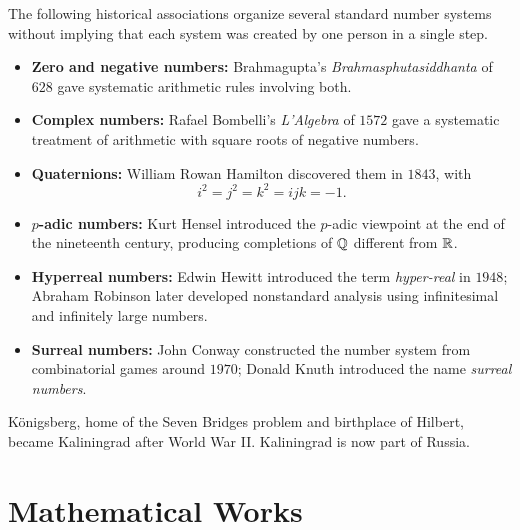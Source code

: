    \begin{fact}
        The following historical associations organize several standard number
        systems without implying that each system was created by one person in
        a single step.
        \begin{itemize}
            \item \textbf{Zero and negative numbers:} Brahmagupta's
                  \textit{Brahmasphutasiddhanta} of $628$ gave systematic
                  arithmetic rules involving both.
            \item \textbf{Complex numbers:} Rafael Bombelli's
                  \textit{L'Algebra} of $1572$ gave a systematic treatment of
                  arithmetic with square roots of negative numbers.
            \item \textbf{Quaternions:} William Rowan Hamilton discovered them
                  in $1843$, with
                  \[
                      i^2=j^2=k^2=ijk=-1.
                  \]
            \item \textbf{$p$-adic numbers:} Kurt Hensel introduced the
                  $p$-adic viewpoint at the end of the nineteenth century,
                  producing completions of $\mathbb{Q}$ different from $\mathbb{R}$.
            \item \textbf{Hyperreal numbers:} Edwin Hewitt introduced the term
                  \emph{hyper-real} in $1948$; Abraham Robinson later developed
                  nonstandard analysis using infinitesimal and infinitely large
                  numbers.
            \item \textbf{Surreal numbers:} John Conway constructed the number
                  system from combinatorial games around $1970$; Donald Knuth
                  introduced the name \emph{surreal numbers}.
        \end{itemize}
    \end{fact}

    \begin{fact}
        Königsberg, home of the Seven Bridges problem and birthplace of Hilbert,
        became Kaliningrad after World War II. Kaliningrad is now part of
        Russia.
    \end{fact}

    \section*{Mathematical Works}


